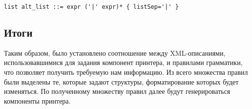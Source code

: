 {
\begin{lstlisting}
list alt_list ::= expr ('|' expr)* { listSep='|' }
\end{lstlisting}
}
\subsection{Итоги}
Таким образом, было установлено соотношение между XML-описаниями, использовавшимися для задания компонент принтера, и правилами грамматики, что позволяет получить требуемую нам информацию.
Из всего множества правил были выделены те, которые задают структуры, форматирование которых будет изменяться.
По полученному множеству правил далее будут генерироваться компоненты принтера.
